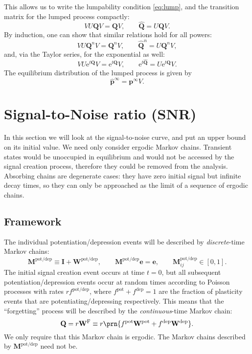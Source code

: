 \documentclass[9pt,twocolumn,twoside,lineno]{pnas-new}
\newcommand{\e}{\mathrm{e}}
\newcommand{\I}{\mathbf{I}}
\newcommand{\onev}{\mathbf{e}}
\newcommand{\MM}{\mathbf{Q}}
\newcommand{\prob}{\mathbf{p}}
\newcommand{\eq}{\prob^\infty}
\newcommand{\W}{\mathbf{W}}
\newcommand{\M}{\mathbf{M}}
\newcommand{\frg}{\W^{\mathrm{F}}}
\newcommand{\pot}{^{\text{pot}}}
\newcommand{\dep}{^{\text{dep}}}
\newcommand{\potdep}{^{\text{pot/dep}}}
\begin{document}
\begin{strip}
This allows us to write the lumpability condition \cref{eq:lump}, and the transition matrix for the lumped process compactly:
%
\begin{equation}\label{eq:lumpcompact}
  VU\MM V = \MM V,
  \qquad
  \widehat{\MM} = U\MM V.
\end{equation}
%
By induction, one can show that similar relations hold for all powers:
%
\begin{equation}\label{eq:lumppower}
  VU\MM^nV = \MM^nV,
  \qquad
  \widehat{\MM}^n = U\MM^n V,
\end{equation}
%
and, via the Taylor series, for the exponential as well:
%
\begin{equation}\label{eq:lumpexp}
  VU \e^{t\MM} V = \e^{t\MM}V,
  \qquad
  \e^{t\widehat{\MM}} = U\e^{t\MM} V.
\end{equation}
%
The equilibrium distribution of the lumped process is given by
%
\begin{equation}\label{eq:lumpeq}
  \widehat{\mathbf{p}}^\infty = \eq V.
\end{equation}
%


\section{Signal-to-Noise ratio (SNR)}\label{sec:SNR}

In this section we will look at the signal-to-noise curve, and put an upper bound on its initial value.
We need only consider ergodic Markov chains.
Transient states would be unoccupied in equilibrium and would not be accessed by the signal creation process, therefore they could be removed from the analysis.
Absorbing chains are degenerate cases: they have zero initial signal but infinite decay times, so they can only be approached as the limit of a sequence of ergodic chains.

\subsection{Framework}\label{sec:framework}

The individual potentiation/depression events will be described by \emph{discrete}-time Markov chains:
%
\begin{equation}\label{eq:MWdef}
  \M\potdep \equiv \I + \W\potdep,
  \qquad
  \M\potdep\onev = \onev,
  \qquad
  \M\potdep_{ij} \in [0,1].
\end{equation}
%
The initial signal creation event occurs at time $t=0$, but all subsequent potentiation/depression events occur at random times according to Poisson processes with rates $rf\potdep$, where $f\pot +f\dep =1$ are the fraction of plasticity events that are potentiating/depressing respectively.
This means that the ``forgetting'' process will be described by the \emph{continuous}-time Markov chain:
%
\begin{equation}\label{eq:forgetting}
  \MM = r \frg \equiv r\prn{f\pot\W\pot + f\dep\W\dep}.
\end{equation}
%
We only require that this Markov chain is ergodic.
The Markov chains described by $\M\potdep $ need not be.



\end{strip}
\end{document}
